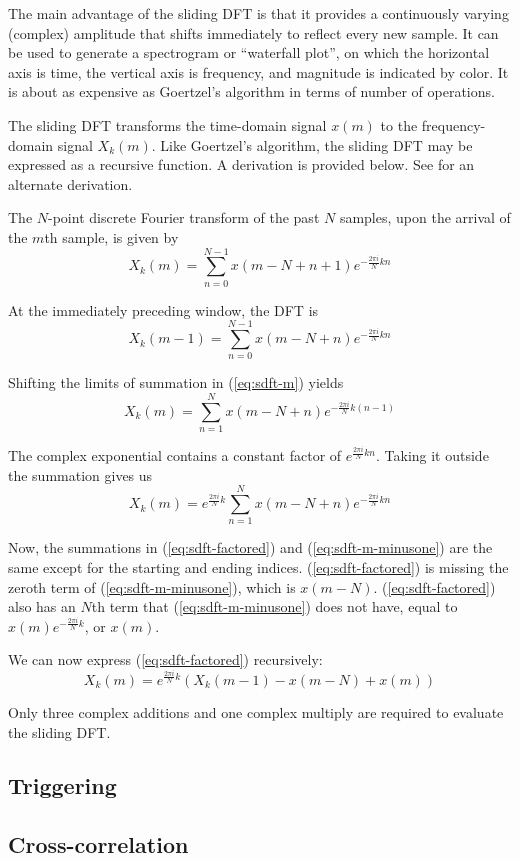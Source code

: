 \documentclass[10pt]{article}
\begin{document}
The main advantage of the sliding DFT is that it provides a continuously varying (complex) amplitude that shifts immediately to reflect every new sample.  It can be used to generate a spectrogram or ``waterfall plot'', on which the horizontal axis is time, the vertical axis is frequency, and magnitude is indicated by color.  It is about as expensive as Goertzel's algorithm in terms of number of operations.

The sliding DFT transforms the time-domain signal \(x(m)\) to the frequency-domain signal \(X_k(m)\).  Like Goertzel's algorithm, the sliding DFT may be expressed as a recursive function.  A derivation is provided below.  See \cite{sliding-dft-ieee} for an alternate derivation.

The \(N\)-point discrete Fourier transform of the past \(N\) samples, upon the arrival of the \(m\)th sample, is given by
\begin{equation}
\label{eq:sdft-m}
X_k(m) = \sum_{n=0}^{N-1} {x(m-N+n+1) e^{- \frac{2 \pi i}{N} kn}}
\end{equation}

At the immediately preceding window, the DFT is
\begin{equation}
\label{eq:sdft-m-minusone}
X_k(m-1) = \sum_{n=0}^{N-1} {x(m-N+n) e^{- \frac{2 \pi i}{N} kn}}
\end{equation}

Shifting the limits of summation in (\ref{eq:sdft-m}) yields
\[
X_k(m) = \sum_{n=1}^{N} {x(m-N+n) e^{- \frac{2 \pi i}{N} k(n-1)}}
\]

The complex exponential contains a constant factor of \(e^{\frac{2 \pi i}{N} kn}\).  Taking it outside the summation gives us
\begin{equation}
\label{eq:sdft-factored}
X_k(m) = e^{\frac{2 \pi i}{N} k} \sum_{n=1}^{N} {x(m-N+n) e^{- \frac{2 \pi i}{N} kn}}
\end{equation}

Now, the summations in (\ref{eq:sdft-factored}) and (\ref{eq:sdft-m-minusone}) are the same except for the starting and ending indices.  (\ref{eq:sdft-factored}) is missing the zeroth term of (\ref{eq:sdft-m-minusone}), which is \(x(m-N)\).  (\ref{eq:sdft-factored}) also has an \(N\)th term that (\ref{eq:sdft-m-minusone}) does not have, equal to \(x(m) e^{- \frac{2 \pi i}{N} k}\), or \(x(m)\).

We can now express (\ref{eq:sdft-factored}) recursively:
\begin{equation}
X_k(m) = e^{\frac{2 \pi i}{N} k} (X_k(m-1) - x(m-N) + x(m))
\end{equation}

Only three complex additions and one complex multiply are required to evaluate the sliding DFT.

\subsection{Triggering}

\subsection{Cross-correlation}

\clearpage



\end{document}
